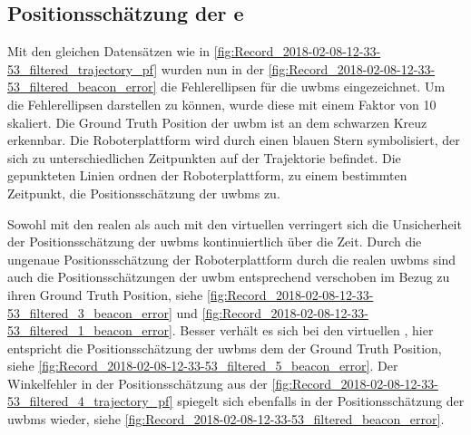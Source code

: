 %
%
%
\subsection{Positionsschätzung der e}

Mit den gleichen Datensätzen wie in \autoref{fig:Record_2018-02-08-12-33-53_filtered_trajectory_pf} wurden nun in der \autoref{fig:Record_2018-02-08-12-33-53_filtered_beacon_error} die Fehlerellipsen für die \glspl{uwbm} eingezeichnet. Um die Fehlerellipsen darstellen zu können, wurde diese mit einem Faktor von 10 skaliert. Die Ground Truth Position der \gls{uwbm} ist an dem schwarzen Kreuz erkennbar. Die Roboterplattform wird durch einen blauen Stern symbolisiert, der sich zu unterschiedlichen Zeitpunkten auf der Trajektorie befindet. Die gepunkteten Linien ordnen der Roboterplattform, zu einem bestimmten Zeitpunkt, die Positionsschätzung der \glspl{uwbm} zu.

Sowohl mit den realen als auch mit den virtuellen  verringert sich die Unsicherheit der Positionsschätzung der \glspl{uwbm} kontinuiertlich über die Zeit. Durch die ungenaue Positionsschätzung der Roboterplattform durch die realen \glspl{uwbm} sind auch die Positionsschätzungen der \gls{uwbm} entsprechend verschoben im Bezug zu ihren Ground Truth Position, siehe \autoref{fig:Record_2018-02-08-12-33-53_filtered_3_beacon_error} und \autoref{fig:Record_2018-02-08-12-33-53_filtered_1_beacon_error}. Besser verhält es sich bei den virtuellen , hier entspricht die Positionsschätzung der \glspl{uwbm} dem der Ground Truth Position, siehe \autoref{fig:Record_2018-02-08-12-33-53_filtered_5_beacon_error}. Der Winkelfehler in der Positionsschätzung aus der \autoref{fig:Record_2018-02-08-12-33-53_filtered_4_trajectory_pf} spiegelt sich ebenfalls in der Positionsschätzung der \glspl{uwbm} wieder, siehe \autoref{fig:Record_2018-02-08-12-33-53_filtered_beacon_error}.


